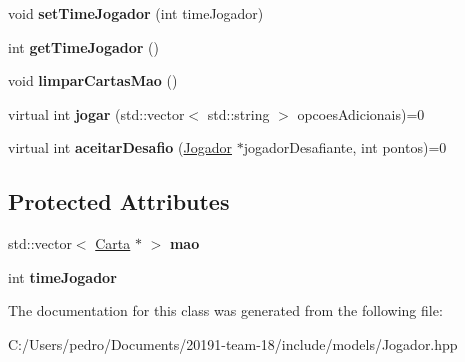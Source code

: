 \begin{DoxyCompactItemize}
void {\bfseries set\+Time\+Jogador} (int time\+Jogador)
\item 
\mbox{\label{class_jogador_a6445980bae531aaca239735557140ffa}} 
int {\bfseries get\+Time\+Jogador} ()
\item 
\mbox{\label{class_jogador_ae9be28c426f205bb1496d38324befc62}} 
void {\bfseries limpar\+Cartas\+Mao} ()
\item 
\mbox{\label{class_jogador_a8af760d8531f7d4e78fc767adcff0cb6}} 
virtual int {\bfseries jogar} (std\+::vector$<$ std\+::string $>$ opcoes\+Adicionais)=0
\item 
\mbox{\label{class_jogador_a4eceb45cff559f97cd441da30d36769c}} 
virtual int {\bfseries aceitar\+Desafio} (\mbox{\hyperlink{class_jogador}{Jogador}} $\ast$jogador\+Desafiante, int pontos)=0
\end{DoxyCompactItemize}
\subsection*{Protected Attributes}
\begin{DoxyCompactItemize}
\item 
\mbox{\label{class_jogador_ad989cab8e9aa172ddb6ed89d019a7e91}} 
std\+::vector$<$ \mbox{\hyperlink{class_carta}{Carta}} $\ast$ $>$ {\bfseries mao}
\item 
\mbox{\label{class_jogador_a799f588b8a5c2504c6a290e617983808}} 
int {\bfseries time\+Jogador}
\end{DoxyCompactItemize}


The documentation for this class was generated from the following file\+:\begin{DoxyCompactItemize}
\item 
C\+:/\+Users/pedro/\+Documents/20191-\/team-\/18/include/models/Jogador.\+hpp\end{DoxyCompactItemize}
